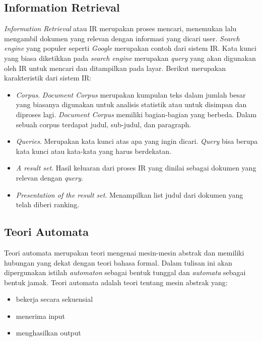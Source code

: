 \subsection{Information Retrieval}
\label{sec:ir}

\textit{Information Retrieval} atau IR merupakan proses mencari, menemukan lalu mengambil dokumen yang relevan dengan informasi yang dicari user. \textit{Search engine} yang populer seperti \textit{Google} merupakan contoh dari sistem IR. Kata kunci yang biasa diketikkan pada \textit{search engine} merupakan \textit{query} yang akan digunakan oleh IR untuk mencari dan ditampilkan pada layar. Berikut merupakan karakteristik dari sistem IR:

\begin{itemize}
	\item \textit{Corpus}. \textit{Document Corpus} merupakan kumpulan teks dalam jumlah besar yang biasanya digunakan untuk analisis statistik atau untuk disimpan dan diproses lagi. \textit{Document Corpus} memiliki bagian-bagian yang berbeda. Dalam sebuah corpus terdapat judul, sub-judul, dan paragraph.
	\item \textit{Queries}. Merupakan kata kunci atas apa yang ingin dicari. \textit{Query} bisa berupa kata kunci atau kata-kata yang harus berdekatan.
	\item \textit{A result set}. Hasil keluaran dari proses IR yang dinilai sebagai dokumen yang relevan dengan \textit{query}.
	\item \textit{Presentation of the result set}. Menampilkan list judul dari dokumen yang telah diberi ranking.
\end{itemize}

\subsection{Teori Automata\cite{Frisca:2014}}
Teori automata merupakan teori mengenai mesin-mesin abstrak dan memiliki hubungan yang dekat dengan teori bahasa formal. Dalam tulisan ini akan dipergunakan istilah \textit{automaton} sebagai bentuk tunggal dan \textit{automata} sebagai bentuk jamak. Teori automata adalah teori tentang mesin abstrak yang:

\begin{itemize}
	\item bekerja secara sekuensial
	\item menerima input
	\item menghasilkan output
\end{itemize}

